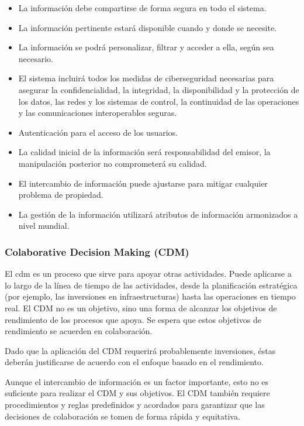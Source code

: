 \begin{itemize}
    \item La información debe compartirse de forma segura en todo el sistema.
    \item La información pertinente estará disponible cuando y donde se necesite.
    \item La información se podrá personalizar, filtrar y acceder a ella, según sea necesario.
    \item El sistema incluirá todos los medidas de ciberseguridad necesarias para asegurar la confidencialidad, la integridad, la disponibilidad y la protección de los datos, las redes y los sistemas de control, la continuidad de las operaciones y las comunicaciones interoperables seguras.
    \item Autenticación para el acceso de los usuarios.
    \item La calidad inicial de la información será responsabilidad del emisor, la manipulación posterior no comprometerá su calidad.
    \item El intercambio de información puede ajustarse para mitigar cualquier problema de propiedad.
    \item La gestión de la información utilizará atributos de información armonizados a nivel mundial.
\end{itemize}

\subsubsection{Colaborative Decision Making (CDM)}

El \acrfull{cdm} es un proceso que sirve para apoyar otras actividades. Puede aplicarse a lo largo de la línea de tiempo de las actividades, desde la planificación estratégica (por ejemplo, las inversiones en infraestructuras) hasta las operaciones en tiempo real. El CDM no es un objetivo, sino una forma de alcanzar los objetivos de rendimiento de los procesos que apoya. Se espera que estos objetivos de rendimiento se acuerden en colaboración. 

Dado que la aplicación del CDM requerirá probablemente inversiones, éstas deberán justificarse de acuerdo con el enfoque basado en el rendimiento.

Aunque el intercambio de información es un factor importante, esto no es suficiente para realizar el CDM y sus objetivos. El CDM también requiere procedimientos y reglas predefinidos y acordados para garantizar que las decisiones de colaboración se tomen de forma rápida y equitativa.

